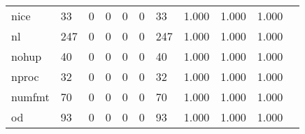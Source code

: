 \begin{longtable}{lp{1.2cm}p{1.2cm}p{1.2cm}p{1.2cm}p{1.2cm}p{1.2cm}p{1.2cm}p{1.2cm}p{1.2cm}p{1.2cm}}
nice      &                                    33 &                                                  0 &                                                  0 &                                                  0 &                                                  0 &                                                 33 &                                         1.000 &                                              1.000 &                                              1.000 \\
nl        &                                   247 &                                                  0 &                                                  0 &                                                  0 &                                                  0 &                                                247 &                                         1.000 &                                              1.000 &                                              1.000 \\
nohup     &                                    40 &                                                  0 &                                                  0 &                                                  0 &                                                  0 &                                                 40 &                                         1.000 &                                              1.000 &                                              1.000 \\
nproc     &                                    32 &                                                  0 &                                                  0 &                                                  0 &                                                  0 &                                                 32 &                                         1.000 &                                              1.000 &                                              1.000 \\
numfmt    &                                    70 &                                                  0 &                                                  0 &                                                  0 &                                                  0 &                                                 70 &                                         1.000 &                                              1.000 &                                              1.000 \\
od        &                                    93 &                                                  0 &                                                  0 &                                                  0 &                                                  0 &                                                 93 &                                         1.000 &                                              1.000 &                                              1.000 \\

\end{longtable}
